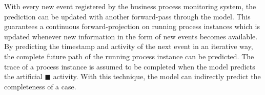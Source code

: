 With every new event registered by the business process monitoring system, the prediction can be updated with another forward-pass through the model.
This guarantees a continuous forward-projection on running process instances which is updated whenever new information in the form of new events becomes available.
By predicting the timestamp and activity of the next event in an iterative way, the complete future path of the running process instance can be predicted.
The trace of a process instance is assumed to be completed when the model predicts the artificial $\blacksquare$ activity.
With this technique, the model can indirectly predict the completeness of a case.